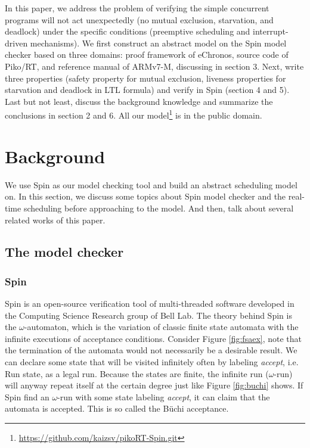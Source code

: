 In this paper, we address the problem of verifying the simple concurrent programs will not act unexpectedly (no mutual exclusion, starvation, and deadlock) under the specific conditions (preemptive scheduling and interrupt-driven mechanisms). We first construct an abstract model on the Spin model checker based on three domains: proof framework of eChronos, source code of Piko/RT, and reference manual of ARMv7-M, discussing in section 3. Next, write three properties (safety property for mutual exclusion, liveness properties for starvation and deadlock in LTL formula) and verify in Spin (section 4 and 5). Last but not least, discuss the background knowledge and summarize the conclusions in section 2 and 6. All our model\footnote{\url{https://github.com/kaizsv/pikoRT-Spin.git}} is in the public domain.

\section{Background}
We use Spin as our model checking tool and build an abstract scheduling model on. In this section, we discuss some topics about Spin model checker and the real-time scheduling before approaching to the model. And then, talk about several related works of this paper.

\subsection{The model checker}
\subsubsection{Spin}
Spin \cite{SpinRoot, Ben-Ari:2008:PSM:1349767, Holzmann:2003:SMC:1405716} is an open-source verification tool of multi-threaded software developed in the Computing Science Research group of Bell Lab. The theory behind Spin is the $\omega$-automaton, which is the variation of classic finite state automata with the infinite executions of acceptance conditions. Consider Figure \ref{fig:fsaex}, note that the termination of the automata would not necessarily be a desirable result. We can declare some state that will be visited infinitely often by labeling \textit{accept}, i.e. Run state, as a legal run. Because the states are finite, the infinite run ($\omega$-run) will anyway repeat itself at the certain degree just like Figure \ref{fig:buchi} shows. If Spin find an $\omega$-run with some state labeling \textit{accept}, it can claim that the automata is accepted. This is so called the B\"uchi acceptance.

